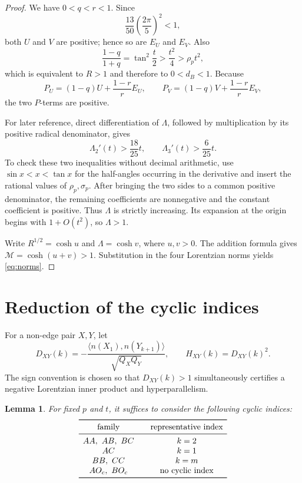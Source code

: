 \documentclass{amsart}
\newtheorem{lemma}{Lemma}
\newcommand{\tablegap}{\par\vspace{0.2cm}}
\begin{document}
\begin{proof}
We have \(0<q<r<1\).  Since
\[
 \frac{13}{50}\left(\frac{2\pi}{5}\right)^2<1,
\]
both \(U\) and \(V\) are positive; hence so are \(E_U\) and \(E_V\).
Also
\[
 \frac{1-q}{1+q}=\tan^2\frac t2>\frac{t^2}{4}>\rho_pt^2,
\]
which is equivalent to \(R>1\) and therefore to \(0<d_B<1\).
Because
\[
 P_U=(1-q)U+\frac{1-r}{r}E_U,
 \qquad
 P_V=(1-q)V+\frac{1-r}{r}E_V,
\]
the two \(P\)-terms are positive.

For later reference, direct differentiation of \(\Lambda\), followed by
multiplication by its positive radical denominator, gives
\begin{equation}\label{eq:lambda-derivative}
 \Lambda_2'(t)>\frac{18}{25}t,
 \qquad
 \Lambda_3'(t)>\frac{6}{25}t.
\end{equation}
To check these two inequalities without decimal arithmetic, use
\(\sin x<x<\tan x\) for the half-angles occurring in the derivative and
insert the rational values of \(\rho_p,\sigma_p\).  After bringing the two
sides to a common positive denominator, the remaining coefficients are
nonnegative and the constant coefficient is positive.  Thus \(\Lambda\) is
strictly increasing.  Its expansion at the origin begins with \(1+O(t^2)\),
so \(\Lambda>1\).

Write \(R^{1/2}=\cosh u\) and \(\Lambda=\cosh v\), where \(u,v>0\).
The addition formula gives \(\mathcal M=\cosh(u+v)>1\).  Substitution in
the four Lorentzian norms yields \eqref{eq:norms}.
\end{proof}

\section{Reduction of the cyclic indices}

For a non-edge pair \(X,Y\), let
\[
 D_{XY}(k)=-\frac{\langle n(X_1),n(Y_{k+1})\rangle}
 {\sqrt{Q_XQ_Y}},
 \qquad H_{XY}(k)=D_{XY}(k)^2.
\]
The sign convention is chosen so that \(D_{XY}(k)>1\) simultaneously
certifies a negative Lorentzian inner product and hyperparallelism.

\begin{lemma}\label{lem:discrete}
For fixed \(p\) and \(t\), it suffices to consider the following cyclic
indices:
\begingroup
\small
\[
 \begin{array}{c@{\qquad}c}
 \toprule
 \text{family}&\text{representative index}\\
 \midrule
 AA,\ AB,\ BC&k=2\\
 AC&k=1\\
 BB,\ CC&k=m\\
 AO_c,\ BO_c&\text{no cyclic index}\\
 \bottomrule
\end{array}
\]
\endgroup
\tablegap
\end{lemma}
\end{document}
